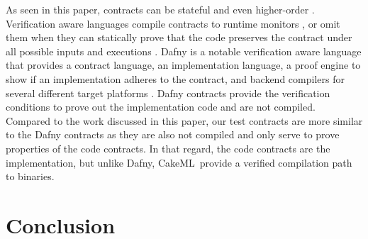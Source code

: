 \documentclass[global,twocolumn]{svjour}
\newcommand{\ckml}{CakeML}
\begin{document}
As seen in this paper, contracts can be stateful and even higher-order \cite{10.1145/583852.581484}.
%
Verification aware languages compile contracts to runtime monitors \cite{10.1007/978-3-642-28869-2_11}, or omit them when they can statically prove that the code preserves the contract under all possible inputs and executions \cite{10.1145/3158139}.
%
Dafny is a notable verification aware language that provides a contract language, an implementation language, a proof engine to show if an implementation adheres to the contract, and backend compilers for several different target platforms \cite{dafny}.
%
Dafny contracts provide the verification conditions to prove out the implementation code and are not compiled.
%
Compared to the work discussed in this paper, our test contracts are more similar to the Dafny contracts as they are also not compiled and only serve to prove properties of the code contracts.
%
In that regard, the code contracts are the implementation, but unlike Dafny, \ckml\ provide a verified compilation path to binaries.

\section{Conclusion}
\label{sec:conclusion}


\clearpage


\end{document}
